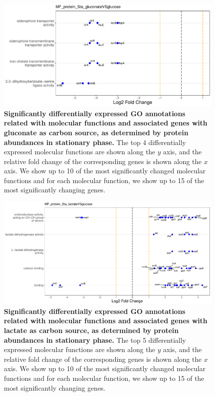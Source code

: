 \documentclass[a4paper]{article}
\begin{document}
\begin{figure}[!htb]
	\includegraphics[width=1.0\textwidth]{../../d_figures/MF07_protein_Sta_gluconateVSglucose_withTitle.pdf}
	\caption[Significantly differentially expressed GO annotations associated with molecular functions for protein samples in stationary phase tested for gluconate against glucose]
	{\textbf{Significantly differentially expressed GO annotations related with molecular functions and associated genes with gluconate as carbon source, as determined by protein abundances in stationary phase.} The top 4 differentially expressed molecular functions are shown along the $y$ axis, and the relative fold change of the corresponding genes is shown along the $x$ axis. We show up to 10 of the most significantly changed molecular functions and for each molecular function, we show up to 15 of the most significantly changing genes.}
\end{figure}

\begin{figure}[!htb]
	\includegraphics[width=1.0\textwidth]{../../d_figures/MF08_protein_Sta_lactateVSglucose_withTitle.pdf}
	\caption[Significantly differentially expressed GO annotations associated with molecular functions for protein samples in stationary phase tested for lactate against glucose]
	{\textbf{Significantly differentially expressed GO annotations related with molecular functions and associated genes with lactate as carbon source, as determined by protein abundances in stationary phase.} The top 5 differentially expressed molecular functions are shown along the $y$ axis, and the relative fold change of the corresponding genes is shown along the $x$ axis. We show up to 10 of the most significantly changed molecular functions and for each molecular function, we show up to 15 of the most significantly changing genes.}
\end{figure}
\end{document}
